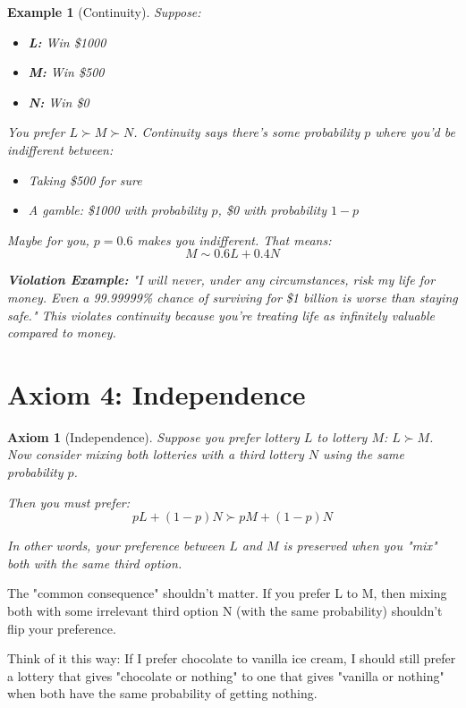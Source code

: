\documentclass[12pt]{article}
\newtheorem{axiom}{Axiom}
\newtheorem{example}{Example}
\begin{document}
\begin{example}[Continuity]
Suppose:
\begin{itemize}
\item \textbf{L:} Win \$1000
\item \textbf{M:} Win \$500
\item \textbf{N:} Win \$0
\end{itemize}

You prefer $L \succ M \succ N$. Continuity says there's some probability $p$ where you'd be indifferent between:
\begin{itemize}
\item Taking \$500 for sure
\item A gamble: \$1000 with probability $p$, \$0 with probability $1-p$
\end{itemize}

Maybe for you, $p = 0.6$ makes you indifferent. That means:
$$M \sim 0.6L + 0.4N$$

\vspace{0.2cm}

\textbf{Violation Example:} "I will never, under any circumstances, risk my life for money. Even a 99.99999\% chance of surviving for \$1 billion is worse than staying safe." This violates continuity because you're treating life as infinitely valuable compared to money.
\end{example}

\newpage

\section{Axiom 4: Independence}

\begin{axiom}[Independence]
Suppose you prefer lottery $L$ to lottery $M$: $L \succ M$. Now consider mixing both lotteries with a third lottery $N$ using the same probability $p$.

Then you must prefer:
$$pL + (1-p)N \succ pM + (1-p)N$$

In other words, your preference between $L$ and $M$ is preserved when you "mix" both with the same third option.
\end{axiom}

\begin{tcolorbox}[colback=intuitioncolor,colframe=orange!75!black,title=Intuition]
The "common consequence" shouldn't matter. If you prefer L to M, then mixing both with some irrelevant third option N (with the same probability) shouldn't flip your preference.

Think of it this way: If I prefer chocolate to vanilla ice cream, I should still prefer a lottery that gives "chocolate or nothing" to one that gives "vanilla or nothing" when both have the same probability of getting nothing.
\end{tcolorbox}
\end{document}
